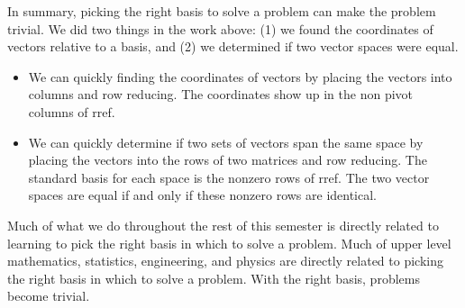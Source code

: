 \begin{enumerate}
\begin{enumerate}
\end{enumerate}

In summary, picking the right basis to solve a problem can make the problem trivial.  We did two things in the work above: (1) we found the coordinates of vectors relative to a basis, and (2) we determined if two vector spaces were equal. 
\begin{itemize}
	\item We can quickly finding the coordinates of vectors by placing the vectors into columns and row reducing. The coordinates show up in the non pivot columns of rref.
	\item We can quickly determine if two sets of vectors span the same space by placing the vectors into the rows of two matrices and row reducing. The standard basis for each space is the nonzero rows of rref. The two vector spaces are equal if and only if these nonzero rows are identical. 
\end{itemize}
Much of what we do throughout the rest of this semester is directly related to learning to pick the right basis in which to solve a problem. Much of upper level mathematics, statistics, engineering, and physics are directly related to picking the right basis in which to solve a problem. With the right basis, problems become trivial.
	

	
\end{enumerate}



